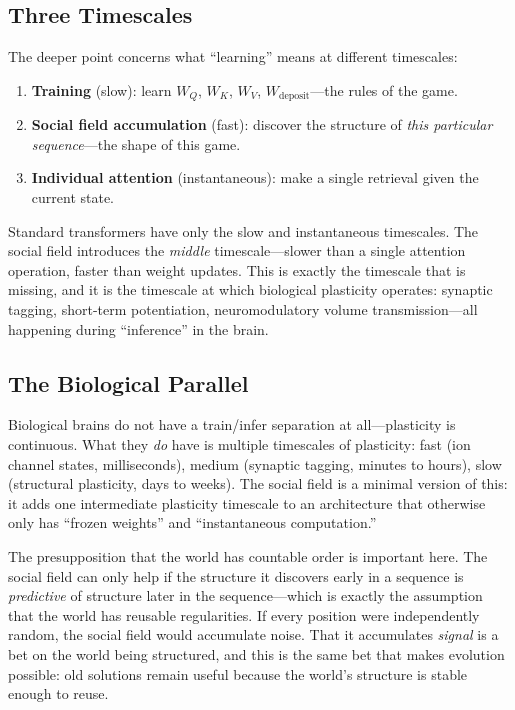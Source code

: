 \documentclass[11pt,a4paper]{article}
\begin{document}
\subsection{Three Timescales}

The deeper point concerns what ``learning'' means at different
timescales:

\begin{enumerate}
    \item \textbf{Training} (slow): learn $W_Q$, $W_K$, $W_V$,
          $W_{\mathrm{deposit}}$---the rules of the game.
    \item \textbf{Social field accumulation} (fast): discover the
          structure of \emph{this particular sequence}---the shape of
          this game.
    \item \textbf{Individual attention} (instantaneous): make a single
          retrieval given the current state.
\end{enumerate}

Standard transformers have only the slow and instantaneous timescales.
The social field introduces the \emph{middle} timescale---slower than a
single attention operation, faster than weight updates.  This is exactly
the timescale that is missing, and it is the timescale at which
biological plasticity operates: synaptic tagging, short-term
potentiation, neuromodulatory volume transmission---all happening during
``inference'' in the brain.

\subsection{The Biological Parallel}

Biological brains do not have a train/infer separation at all---plasticity
is continuous.  What they \emph{do} have is multiple timescales of
plasticity: fast (ion channel states, milliseconds), medium (synaptic
tagging, minutes to hours), slow (structural plasticity, days to weeks).
The social field is a minimal version of this: it adds one intermediate
plasticity timescale to an architecture that otherwise only has ``frozen
weights'' and ``instantaneous computation.''

The presupposition that the world has countable order is important here.
The social field can only help if the structure it discovers early in a
sequence is \emph{predictive} of structure later in the sequence---which
is exactly the assumption that the world has reusable regularities.  If
every position were independently random, the social field would
accumulate noise.  That it accumulates \emph{signal} is a bet on the
world being structured, and this is the same bet that makes evolution
possible: old solutions remain useful because the world's structure is
stable enough to reuse.
\end{document}
